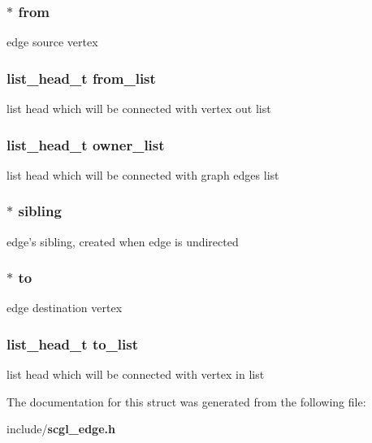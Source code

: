 \subsubsection[{from}]{$\ast$ {\bf from}}\label{structscgl__edge_aa9a780613dc4c37db5ac67e555622c93}
edge source vertex 
\subsubsection[{from\-\_\-list}]{\setlength{\rightskip}{0pt plus 5cm}list\-\_\-head\-\_\-t {\bf from\-\_\-list}}\label{structscgl__edge_acf8f950a5ca94beebbc94b2ff49da94e}
list head which will be connected with vertex out list 
\subsubsection[{owner\-\_\-list}]{\setlength{\rightskip}{0pt plus 5cm}list\-\_\-head\-\_\-t {\bf owner\-\_\-list}}\label{structscgl__edge_a6e2f0c2302d0b754a3ee6bb58072829a}
list head which will be connected with graph edges list 
\subsubsection[{sibling}]{$\ast$ {\bf sibling}}\label{structscgl__edge_a651134bb7f6b9eb747db1e093a2b8f2f}
edge's sibling, created when edge is undirected 
\subsubsection[{to}]{$\ast$ {\bf to}}\label{structscgl__edge_a714fec4148cea2ff75b9c1cc37fc27b7}
edge destination vertex 
\subsubsection[{to\-\_\-list}]{\setlength{\rightskip}{0pt plus 5cm}list\-\_\-head\-\_\-t {\bf to\-\_\-list}}\label{structscgl__edge_a928bea3c7794b6e321688c5e15285382}
list head which will be connected with vertex in list 

The documentation for this struct was generated from the following file\-:\begin{DoxyCompactItemize}
\item 
include/{\bf scgl\-\_\-edge.\-h}\end{DoxyCompactItemize}
